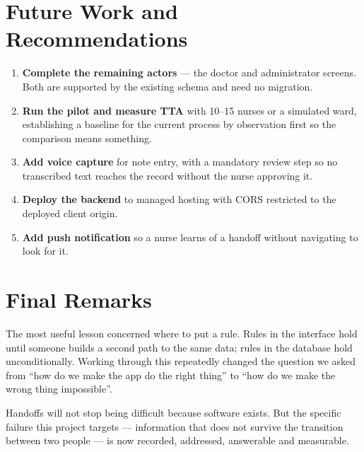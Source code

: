 \documentclass{tietreport}
\begin{document}
\section{Future Work and Recommendations}
\label{sec:futurework}

\begin{enumerate}
  \item \textbf{Complete the remaining actors} --- the
    doctor and administrator screens. Both are supported by
    the existing schema and need no migration.
  \item \textbf{Run the pilot and measure TTA} with 10--15
    nurses or a simulated ward, establishing a baseline for
    the current process by observation first so the
    comparison means something.
  \item \textbf{Add voice capture} for note entry, with a
    mandatory review step so no transcribed text reaches the
    record without the nurse approving it.
  \item \textbf{Deploy the backend} to managed hosting with
    CORS restricted to the deployed client origin.
  \item \textbf{Add push notification} so a nurse learns of
    a handoff without navigating to look for it.
\end{enumerate}

\section{Final Remarks}

The most useful lesson concerned where to put a rule. Rules
in the interface hold until someone builds a second path to
the same data; rules in the database hold unconditionally.
Working through this repeatedly changed the question we
asked from ``how do we make the app do the right thing'' to
``how do we make the wrong thing impossible''.

Handoffs will not stop being difficult because software
exists. But the specific failure this project targets ---
information that does not survive the transition between two
people --- is now recorded, addressed, answerable and
measurable.


\printbibliography[heading=bibintoc]
\end{document}
